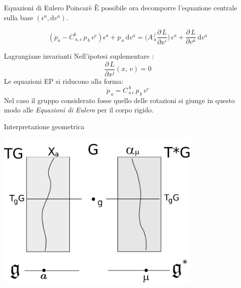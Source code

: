 \documentclass{beamer}
\begin{document}
\begin{frame}{Equazioni di Eulero Poincarè}
È possibile ora decomporre l'equazione centrale sulla base $ (\epsilon^{a}, \textrm{d} v^{a})$.

\begin{displaymath}
(\dot{p}_{a} - C^{b}_{\: a, c} \, p_{\,b} \, v^{c}) \epsilon^{a} + p_{\,a}\, \textrm{d}v^{a} = \Bigr( A^{\, j}_{\: a}\dfrac{\partial \, L}{\partial x^{i}} \Bigr)\, \epsilon^{a} + \dfrac{\partial \, L}{\partial v^{a}}\, \textrm{d}v^{a}
\end{displaymath}
\vfill
{}



\end{frame}


\begin{frame}{Lagrangiane invarianti}
Nell’ipotesi suplementare :
\begin{displaymath}
\dfrac{\partial \, L}{\partial x^{j}}(x,\,v) = 0
\end{displaymath}
Le equazioni EP si riducono alla forma:
$$\dot{p}_{\,a} = C^{\: b}_{\, a \, c}\, p_{\,b} \, v^{c} $$
\vfill
Nel caso il gruppo considerato fosse quello delle rotazioni si giunge in questo modo alle \emph{Equazioni di Eulero} per il corpo rigido.

\end{frame}



\begin{frame}{Interpretazione geometrica} \begin{center} \includegraphics[width=10cm,keepaspectratio]{Fig/schemadoppiafibratura.pdf} \end{center} \end{frame}
\end{document}
